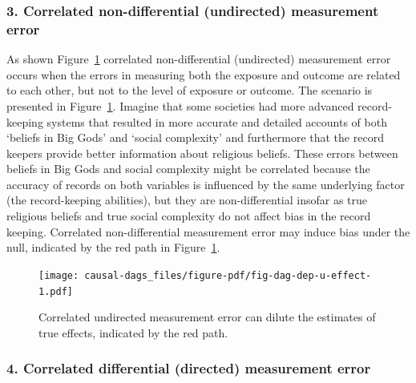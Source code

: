 \documentclass[
  singlecolumn]{report}
\begin{document}
\hypertarget{correlated-non-differential-undirected-measurement-error}{%
\subsubsection{\texorpdfstring{3. \textbf{Correlated non-differential
(undirected) measurement
error}}{3. Correlated non-differential (undirected) measurement error}}\label{correlated-non-differential-undirected-measurement-error}}

As shown Figure~\ref{fig-dag-dep-u-effect} correlated non-differential
(undirected) measurement error occurs when the errors in measuring both
the exposure and outcome are related to each other, but not to the level
of exposure or outcome. The scenario is presented in
Figure~\ref{fig-dag-dep-u-effect}. Imagine that some societies had more
advanced record-keeping systems that resulted in more accurate and
detailed accounts of both `beliefs in Big Gods' and `social complexity'
and furthermore that the record keepers provide better information about
religious beliefs. These errors between beliefs in Big Gods and social
complexity might be correlated because the accuracy of records on both
variables is influenced by the same underlying factor (the
record-keeping abilities), but they are non-differential insofar as true
religious beliefs and true social complexity do not affect bias in the
record keeping. Correlated non-differential measurement error may induce
bias under the null, indicated by the red path in
Figure~\ref{fig-dag-dep-u-effect}.

\begin{figure}

{\centering \texttt{[image: causal-dags\_files/figure-pdf/fig-dag-dep-u-effect-1.pdf]}

}

\caption{\label{fig-dag-dep-u-effect}Correlated undirected measurement
error can dilute the estimates of true effects, indicated by the red
path.}

\end{figure}

\hypertarget{correlated-differential-directed-measurement-error}{%
\subsubsection{\texorpdfstring{4. \textbf{Correlated differential
(directed) measurement
error}}{4. Correlated differential (directed) measurement error}}\label{correlated-differential-directed-measurement-error}}
\end{document}
